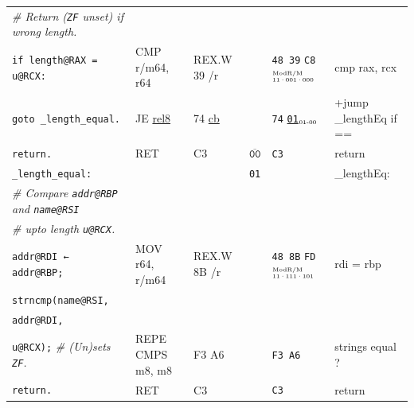 \documentclass[a4paper,12pt,final]{article}
\begin{document}
\begin{table}[!htbp]
\begin{adjustwidth}{-1cm}{-1cm}
\begin{center}
\begin{tabular}{l|ll|l|lH}
\hspace{1.053000em} \emph{\# Return (\texttt{ZF} unset) if wrong length.} &  &  &  &  & \\[0pt]
\hspace{1.053000em} \texttt{if length@RAX = u@RCX:} & CMP r/m64, r64 & REX.W 39 /r &  & \texttt{48 39} \texttt{C8}​\(^{\text{\tiny ModR/M}}_{\text{\tiny 11·001·000}}\) & cmp rax, rcx\\[0pt]
\hspace{2.106000em}   \texttt{goto \_length\_equal.} & JE \uline{rel8} & 74 \uline{cb} &  & \texttt{74} \uline{\texttt{01}}​\(_{\text{\tiny 01-00}}\) & +jump \_lengthEq if ==\\[0pt]
\hspace{1.053000em} \texttt{return.} & RET & C3 & \(\overline{\texttt{00}}\) & \texttt{C3} & return\\[0pt]
\texttt{\_length\_equal:} &  &  & \texttt{01} &  & \_lengthEq:\\[0pt]
\hspace{1.053000em} \emph{\# Compare \texttt{addr@RBP} and \texttt{name@RSI}} &  &  &  &  & \\[0pt]
\hspace{1.053000em} \emph{\# upto length \texttt{u@RCX}.} &  &  &  &  & \\[0pt]
\hspace{1.053000em} \texttt{addr@RDI ← addr@RBP;} & MOV r64, r/m64 & REX.W 8B /r &  & \texttt{48 8B} \texttt{FD}​\(^{\text{\tiny ModR/M}}_{\text{\tiny 11·111·101}}\) & rdi = rbp\\[0pt]
\hspace{1.053000em} \texttt{strncmp(name@RSI,} &  &  &  &  & \\[0pt]
\hspace{5.265000em}        \texttt{addr@RDI,} &  &  &  &  & \\[0pt]
\hspace{5.265000em}        \texttt{u@RCX);}  \emph{\# (Un)sets \texttt{ZF}.} & REPE CMPS m8, m8 & F3 A6 &  & \texttt{F3 A6} & strings equal ?\\[0pt]
\hspace{1.053000em} \texttt{return.} & RET & C3 &  & \texttt{C3} & return\\[0pt]
\end{tabular}

\end{center}
\normalsize \end{adjustwidth} \end{table} \vspace{0}
\end{document}
